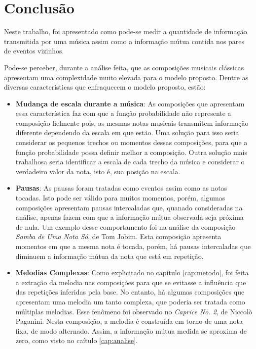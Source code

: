 \section{Conclusão}

Neste trabalho, foi apresentado como pode-se medir a quantidade de informação transmitida por uma música assim como a informação mútua contida nos pares de eventos vizinhos.

Pode-se perceber, durante a análise feita, que as composições musicais clássicas apresentam uma complexidade muito elevada para o modelo proposto. Dentre as diversas características que enfraquecem o modelo proposto, estão:

\begin{itemize}
    \item \textbf{Mudança de escala durante a música}: As composições que apresentam essa característica faz com que a função probabilidade não represente a composição fielmente pois, as mesmas notas musicais transmitem informação diferente dependendo da escala em que estão. Uma solução para isso seria considerar os pequenos trechos ou momentos dessas composições, para que a função probabilidade possa definir melhor a composição. Outra solução mais trabalhosa seria identificar a escala de cada trecho da música e considerar o verdadeiro valor da nota, isto é, sua posição na escala.
    \item \textbf{Pausas}: As pausas foram tratadas como eventos assim como as notas tocadas. Isto pode ser válido para muitos momentos, porém, algumas composições apresentam pausas intercaladas que, quanado consideradas na análise, apenas fazem com que a informação mútua observada seja próxima de nula. Um exemplo desse comportamento foi na análise da composição \textit{Samba de Uma Nota Só}, de Tom Jobim. Esta composição apresenta momentos em que a mesma nota é tocada, porém, há pausas intercaladas que diminuem a informação mútua da nota que está em repetição.
    \item \textbf{Melodias Complexas}: Como explicitado no capítulo \ref{cap:metodo}, foi feita a extração da melodia nas composições para que se evitasse a influência que das repetições inferidas pela base. No entanto, há algumas composições que apresentam uma melodia um tanto complexa, que poderia ser tratada como múltiplas melodias. Esse fenômeno foi observado no \textit{Caprice No. 2}, de Niccolò Paganini. Nesta composição, a melodia é construída em torno de uma nota fixa, de modo alternado. Assim, a informação mútua medida se aproxima de zero, como visto no caítulo \ref{cap:analise}.
\end{itemize}

